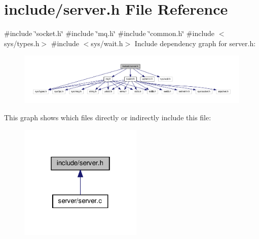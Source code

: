 \section{include/server.h File Reference}
\label{server_8h}
{\ttfamily \#include \char`\"{}socket.\+h\char`\"{}}\newline
{\ttfamily \#include \char`\"{}mq.\+h\char`\"{}}\newline
{\ttfamily \#include \char`\"{}common.\+h\char`\"{}}\newline
{\ttfamily \#include $<$sys/types.\+h$>$}\newline
{\ttfamily \#include $<$sys/wait.\+h$>$}\newline
Include dependency graph for server.\+h\+:
\nopagebreak
\begin{figure}[H]
\begin{center}
\leavevmode
\includegraphics[width=350pt]{server_8h__incl}
\end{center}
\end{figure}
This graph shows which files directly or indirectly include this file\+:
\nopagebreak
\begin{figure}[H]
\begin{center}
\leavevmode
\includegraphics[width=166pt]{server_8h__dep__incl}
\end{center}
\end{figure}
